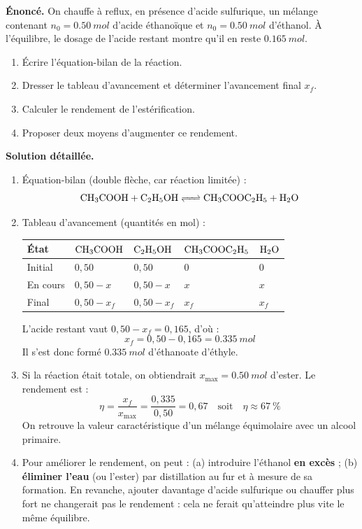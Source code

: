 \documentclass[11pt]{article}
\begin{document}
\begin{exoresolu}
\textbf{Énoncé.} On chauffe à reflux, en présence d'acide sulfurique, un mélange contenant $n_0 = \SI{0,50}{mol}$ d'acide éthanoïque et $n_0 = \SI{0,50}{mol}$ d'éthanol. À l'équilibre, le dosage de l'acide restant montre qu'il en reste $\SI{0,165}{mol}$.
\begin{enumerate}
\item Écrire l'équation-bilan de la réaction.
\item Dresser le tableau d'avancement et déterminer l'avancement final $x_f$.
\item Calculer le rendement de l'estérification.
\item Proposer deux moyens d'augmenter ce rendement.
\end{enumerate}
\tcblower
\textbf{Solution détaillée.}
\begin{enumerate}
\item Équation-bilan (double flèche, car réaction limitée) :
\[ \ce{CH3COOH + C2H5OH <=> CH3COOC2H5 + H2O} \]
\item Tableau d'avancement (quantités en mol) :
\begin{center}
\begin{tabularx}{\linewidth}{|l|X|X|X|X|}
\hline
\rowcolor{popblueL} \textbf{État} & $\ce{CH3COOH}$ & $\ce{C2H5OH}$ & $\ce{CH3COOC2H5}$ & $\ce{H2O}$ \\
\hline
Initial & $0{,}50$ & $0{,}50$ & $0$ & $0$ \\
\hline
En cours & $0{,}50 - x$ & $0{,}50 - x$ & $x$ & $x$ \\
\hline
Final & $0{,}50 - x_f$ & $0{,}50 - x_f$ & $x_f$ & $x_f$ \\
\hline
\end{tabularx}
\end{center}
L'acide restant vaut $0{,}50 - x_f = 0{,}165$, d'où :
\[ x_f = 0{,}50 - 0{,}165 = \SI{0,335}{mol} \]
Il s'est donc formé $\SI{0,335}{mol}$ d'éthanoate d'éthyle.
\item Si la réaction était totale, on obtiendrait $x_{\max} = \SI{0,50}{mol}$ d'ester. Le rendement est :
\[ \eta = \frac{x_f}{x_{\max}} = \frac{0{,}335}{0{,}50} = 0{,}67 \quad \text{soit} \quad \eta \approx 67\ \% \]
On retrouve la valeur caractéristique d'un mélange équimolaire avec un alcool primaire.
\item Pour améliorer le rendement, on peut : (a) introduire l'éthanol \textbf{en excès} ; (b) \textbf{éliminer l'eau} (ou l'ester) par distillation au fur et à mesure de sa formation. En revanche, ajouter davantage d'acide sulfurique ou chauffer plus fort ne changerait pas le rendement : cela ne ferait qu'atteindre plus vite le même équilibre.
\end{enumerate}
\end{exoresolu}
\end{document}
